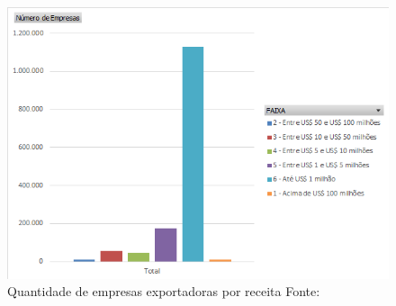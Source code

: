 \begin{figure}[ht!]
    \centering
    \includegraphics[scale=0.85]{Imagens/Empresas_Exportadoras.png}
    \caption{Quantidade de empresas exportadoras por receita  Fonte: \cite{MINECON}}
\end{figure}